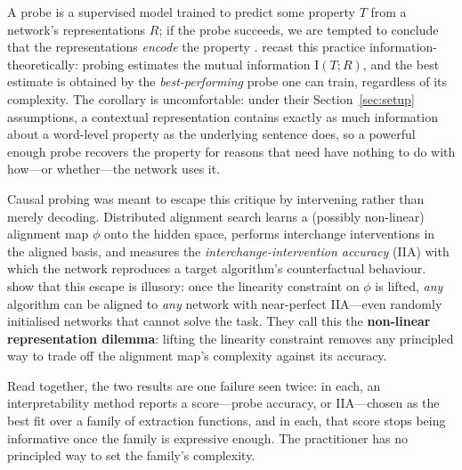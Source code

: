 \documentclass[11pt]{article}
\newcommand{\R}{R}                       %
\newcommand{\T}{T}                       %
\begin{document}
A probe is a supervised model trained to predict some property $\T$ from a
network's representations $\R$; if the probe succeeds, we are tempted to conclude
that the representations \emph{encode} the property
\citep{alain2017understanding,hewitt2019structural,belinkov2022probing}.
\citet{pimentel2020information} recast this practice information-theoretically:
probing estimates the mutual information $\mathrm{I}(\T;\R)$, and the
best estimate is obtained by the \emph{best-performing} probe one can train,
regardless of its complexity. The corollary is uncomfortable: under their
Section~\ref{sec:setup} assumptions, a contextual representation contains exactly as
much information about a word-level property as the underlying sentence does, so a
powerful enough probe recovers the property for reasons that need have nothing to
do with how---or whether---the network uses it.

Causal probing was meant to escape this critique by intervening rather than
merely decoding. Distributed alignment search \citep[DAS;][]{geiger2024finding}
learns a (possibly non-linear) alignment map $\phi$ onto the hidden space, performs
interchange interventions in the aligned basis, and measures the
\emph{interchange-intervention accuracy} (IIA) with which the network reproduces a
target algorithm's counterfactual behaviour.
\citet{sutter2025nonlinear} show that this escape is illusory: once the linearity
constraint on $\phi$ is lifted, \emph{any} algorithm can be aligned to \emph{any}
network with near-perfect IIA---even randomly initialised networks that cannot
solve the task. They call this the \textbf{non-linear representation dilemma}:
lifting the linearity constraint removes any principled way to trade off the
alignment map's complexity against its accuracy.

Read together, the two results are one failure seen twice: in each, an
interpretability method reports a score---probe accuracy, or IIA---chosen as the best
fit over a family of extraction functions, and in each, that score stops being
informative once the family is expressive enough. The practitioner has no principled
way to set the family's complexity.
\end{document}
